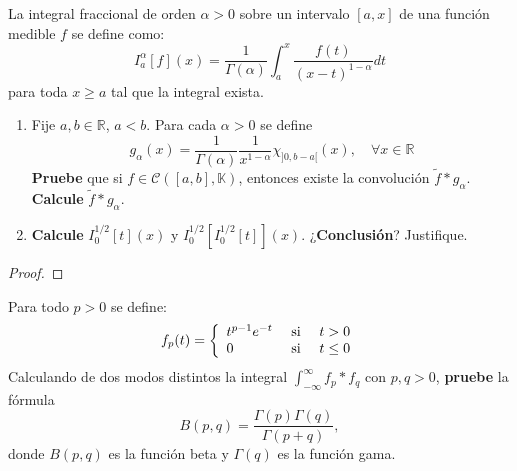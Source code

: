 \documentclass[12pt]{report}
\theoremstyle{largebreak}
\begin{document}
    \begin{excer}
        La integral fraccional de orden $\alpha>0$ sobre un intervalo $[a,x]$ de una función medible $f$ se define como:
        \begin{equation*}
            I_a^\alpha[f](x)=\frac{1}{\Gamma(\alpha)}\int_a^x\frac{f(t)}{(x-t)^{1-\alpha}}dt
        \end{equation*}
        para toda $x\geq a$ tal que la integral exista.
        \begin{enumerate}
            \item Fije $a,b\in\mathbb{R}$, $a<b$. Para cada $\alpha>0$ se define
            \begin{equation*}
                g_\alpha(x)=\frac{1}{\Gamma(\alpha)}\frac{1}{x^{1-\alpha}}\chi_{]0,b-a[}(x),\quad\forall x\in\mathbb{R}
            \end{equation*}
            \textbf{Pruebe} que si $f\in\mathcal{C}([a,b],\mathbb{K})$, entonces existe la convolución $\widetilde{f}*g_\alpha$. \textbf{Calcule} $\widetilde{f}*g_\alpha$.

            \item \textbf{Calcule} $I_0^{1/2}[t](x)$ y $I_0^{1/2}[I_0^{1/2}[t]](x)$. ¿\textbf{Conclusión}? Justifique.
        \end{enumerate}
    \end{excer}

    \begin{proof}
        
    \end{proof}

    \begin{excer}
        Para todo $p>0$ se define:
        \begin{equation*}
            f_p(t)=\left\{\begin{array}{lcr}
                t^{p-1}e^{-t} & \textup{ si }& t>0\\
                0 & \textup{ si } & t\leq 0\\
            \end{array}
            \right.
        \end{equation*}
        Calculando de dos modos distintos la integral $\int_{-\infty}^\infty f_p*f_q$ con $p,q>0$, \textbf{pruebe} la fórmula
        \begin{equation*}
            B(p,q)=\frac{\Gamma(p)\Gamma(q)}{\Gamma(p+q)},
        \end{equation*}
        donde $B(p,q)$ es la función beta y $\Gamma(q)$ es la función gama.
    \end{excer}
    
\end{document}
